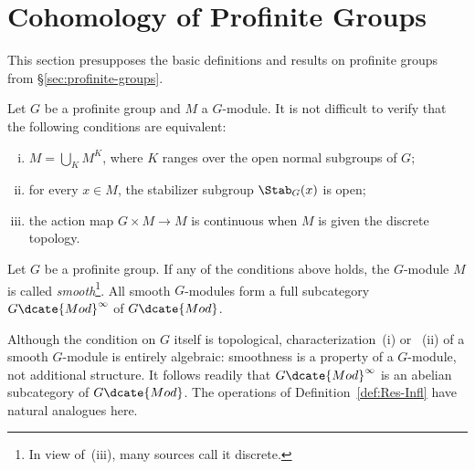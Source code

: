 
\section{Cohomology of Profinite Groups}\label{sec:profinite-cohomology}
\hypertarget{o014.aljabr2.chapter6.profinite-cohomology-a}{ }

This section presupposes the basic definitions and results on profinite groups
from \S\ref{sec:profinite-groups}.

Let $G$ be a profinite group and $M$ a $G$-module. It is not difficult to
verify that the following conditions are equivalent:
\begin{enumerate}[(i)]
	\item $M=\bigcup_KM^K$, where $K$ ranges over the open normal subgroups of
	$G$;
	\item for every $x\in M$, the stabilizer subgroup $\Stab_G(x)$ is open;
	\item the action map $G\times M\to M$ is continuous when $M$ is given the
	discrete topology.
\end{enumerate}

\begin{definition}
	Let $G$ be a profinite group. If any of the conditions above holds, the
	$G$-module $M$ is called \emph{smooth}\footnote{In view of~(iii), many
	sources call it discrete.}. All smooth $G$-modules form a full subcategory
	$G\dcate{Mod}^\infty$ of $G\dcate{Mod}$.
\end{definition}

Although the condition on $G$ itself is topological, characterization~(i) or
~(ii) of a smooth $G$-module is entirely algebraic: smoothness is a property
of a $G$-module, not additional structure. It follows readily that
$G\dcate{Mod}^\infty$ is an abelian subcategory of $G\dcate{Mod}$. The
operations of Definition~\ref{def:Res-Infl} have natural analogues here.

